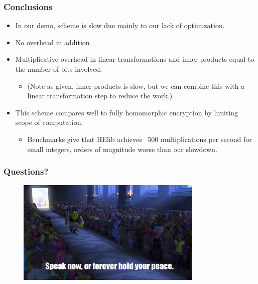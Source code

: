 \documentclass{beamer}
\newcommand{\itz}[1]{\begin{itemize}#1\end{itemize}} %
\begin{document}
\begin{frame}
\frametitle{Conclusions}
\itz{
\item{In our demo, scheme is slow due mainly to our lack of optimization.}
\vspace{.1in}
\item{No overhead in addition}
\item{Multiplicative overhead in linear transformations and inner products equal to the number of bits involved.
	\itz{
		\item{(Note as given, inner products is slow, but we can combine this with a linear transformation step to reduce the work.)}
	}
}
\vspace{.1in}
\item{This scheme compares well to fully homomorphic encryption by limiting scope of computation.
	\itz{
		\item{Benchmarks give that HElib achieves ~500 multiplications per second for small integers, orders of magnitude worse than our slowdown.}
	}
}
}
\end{frame}


\begin{frame}
\frametitle{Questions?}
\begin{figure}[ht]
\centering
\includegraphics[width=3.5in]{questions}
\end{figure}
\end{frame}
\end{document}
